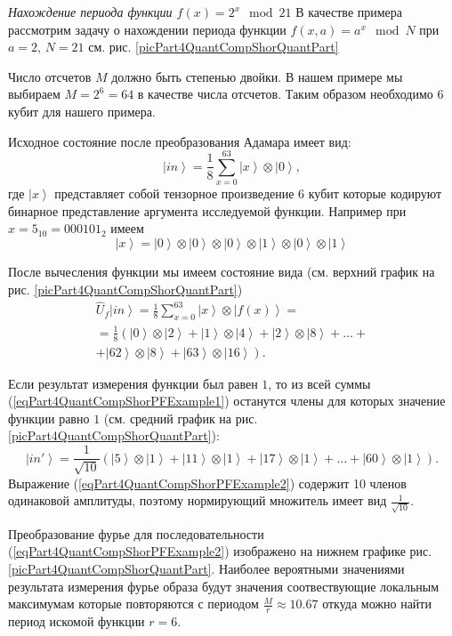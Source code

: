 \begin{example}
\emph{Нахождение периода функции $f\left(x\right) = 2^x \mod 21$}
\label{exPart4QuantCompShorQuantPeriodFinding}
В качестве примера рассмотрим задачу о нахождении периода функции 
$f\left(x, a\right) = a^x \mod{N}$ при $a=2$, $N = 21$ см. рис. 
\ref{picPart4QuantCompShorQuantPart}

Число отсчетов  $M$ должно быть степенью двойки. В нашем примере мы
выбираем $M = 2^6 = 64$ в качестве числа отсчетов. Таким образом
необходимо 6 кубит для нашего примера.

Исходное состояние после  преобразования Адамара имеет вид:
\begin{equation}
\left|in\right> = \frac{1}{8}\sum_{x = 0}^{63}\left|x\right> \otimes \left|0\right>,
\nonumber
\end{equation}
где $\left|x\right>$ представляет собой тензорное произведение 6 кубит
которые кодируют бинарное представление аргумента исследуемой
функции. Например при $x=5_{10}=000101_2$ имеем
\[
\left|x\right> = \left|0\right>\otimes \left|0\right>\otimes
\left|0\right>\otimes 
\left|1\right>\otimes \left|0\right>\otimes \left|1\right>
\]

После вычесления функции мы имеем состояние вида (см. верхний график
на рис. \ref{picPart4QuantCompShorQuantPart})
\begin{eqnarray}
\hat{U}_f\left|in\right> = \frac{1}{8}\sum_{x = 0}^{63}\left|x\right>
\otimes \left|f\left(x\right)\right> = 
\nonumber \\
=
\frac{1}{8}
\left(
\left|0\right>\otimes\left|2\right> + 
\left|1\right>\otimes\left|4\right> + 
\left|2\right>\otimes\left|8\right> + \dots +
\right.
\nonumber \\
\left.
+
\left|62\right>\otimes\left|8\right> +
\left|63\right>\otimes\left|16\right>
\right).
\label{eqPart4QuantCompShorPFExample1}
\end{eqnarray}

Если результат измерения функции был равен $1$, то из всей суммы
(\ref{eqPart4QuantCompShorPFExample1}) останутся члены для которых
значение функции равно $1$ (см. средний график
на рис. \ref{picPart4QuantCompShorQuantPart}):
\begin{equation}
\left|in'\right> = \frac{1}{\sqrt{10}}\left( 
\left|5\right>\otimes\left|1\right> +
\left|11\right>\otimes\left|1\right> +
\left|17\right>\otimes\left|1\right> +
\dots +
\left|60\right>\otimes\left|1\right>
\right).
\label{eqPart4QuantCompShorPFExample2}
\end{equation} 
Выражение (\ref{eqPart4QuantCompShorPFExample2}) содержит 10 членов
одинаковой амплитуды, поэтому нормирующий множитель имеет вид
$\frac{1}{\sqrt{10}}$.

Преобразование фурье для последовательности
(\ref{eqPart4QuantCompShorPFExample2}) изображено на нижнем графике
рис. \ref{picPart4QuantCompShorQuantPart}. Наиболее вероятными
значениями результата измерения фурье образа будут значения
соотвествующие локальным максимумам которые повторяются с периодом 
$\frac{M}{r}\approx10.67$ откуда можно найти период искомой функции
$r=6$. 

\end{example}
